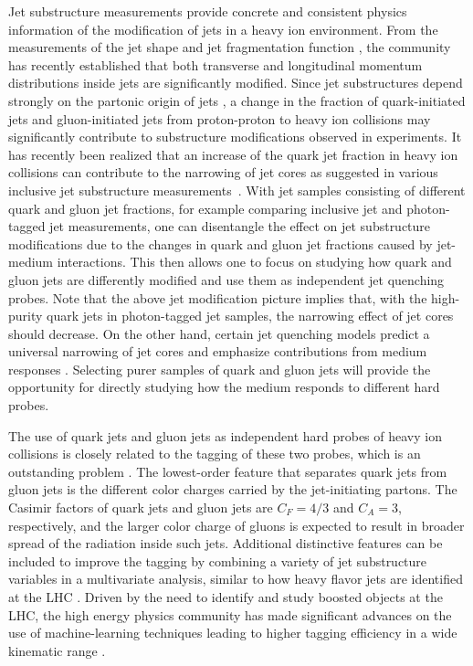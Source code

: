 \documentclass[notoc,preprintnumbers]{JHEP3}
\begin{document}
Jet substructure measurements provide concrete and consistent physics information of the modification of jets in a heavy ion environment. From the measurements of the jet shape \cite{Ellis:1992qq,Chatrchyan:2013kwa,Khachatryan:2016tfj,Seymour:1997kj,Li:2011hy,Li:2012bw,Vitev:2008rz,Vitev:2009rd} and jet fragmentation function \cite{Procura:2009vm,Chatrchyan:2012gw,Aad:2014wha,Chatrchyan:2014ava,Aaboud:2017bzv,Sirunyan:2018qec}, the community has recently established that both transverse and longitudinal momentum distributions inside jets are significantly modified. Since jet substructures depend strongly on the partonic origin of jets \cite{Gallicchio:2011xq,Gallicchio:2012ez,Chien:2012ur,Chien:2015ctp,Chien:2014nsa}, a change in the fraction of quark-initiated jets and gluon-initiated jets from proton-proton to heavy ion collisions may significantly contribute to substructure modifications observed in experiments. It has recently been realized that an increase of the quark jet fraction in heavy ion collisions can contribute to the narrowing of jet cores as suggested in various inclusive jet substructure measurements~\cite{Chien:2015hda,Spousta:2015fca}. With jet samples consisting of different quark and gluon jet fractions, for example comparing inclusive jet and photon-tagged jet measurements, one can disentangle the effect on jet substructure modifications due to the changes in quark and gluon jet fractions caused by jet-medium interactions. This then allows one to focus on studying how quark and gluon jets are differently modified and use them as independent jet quenching probes. Note that the above jet modification picture implies that, with the high-purity quark jets in photon-tagged jet samples, the narrowing effect of jet cores should decrease. On the other hand, certain jet quenching models predict a universal narrowing of jet cores \cite{KunnawalkamElayavalli:2017hxo,Milhano:2017nzm,Casalderrey-Solana:2016jvj,Brewer:2017fqy} and emphasize contributions from medium responses \cite{Tachibana:2017syd}. Selecting purer samples of quark and gluon jets will provide the opportunity for directly studying how the medium responds to different hard probes.

The use of quark jets and gluon jets as independent hard probes of heavy ion collisions is closely related to the tagging of these two probes, which is an outstanding problem \cite{Gras:2017jty,Frye:2017yrw}. The lowest-order feature that separates quark jets from gluon jets is the different color charges carried by the jet-initiating partons. The Casimir factors of quark jets and gluon jets are $C_F = 4/3$ and $C_A=3$, respectively, and the larger color charge of gluons is expected to result in broader spread of the radiation inside such jets. Additional distinctive features can be included to improve the tagging by combining a variety of jet substructure variables in a multivariate analysis, similar to how heavy flavor jets are identified at the LHC \cite{Chatrchyan:2012jua, Aad:2015ydr}. Driven by the need to identify and study boosted objects at the LHC, the high energy physics community has made significant advances on the use of machine-learning techniques leading to higher tagging efficiency in a wide kinematic range \cite{Komiske:2016rsd, Larkoski:2017jix}.
\end{document}
